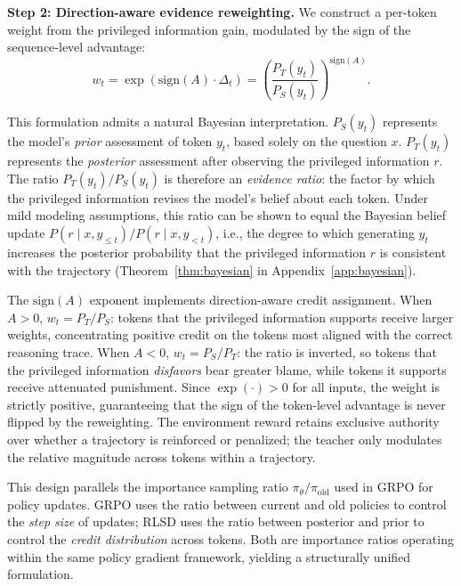 \documentclass[]{jingdong}
\begin{document}
\noindent \textbf{Step 2: Direction-aware evidence reweighting.}
We construct a per-token weight from the privileged information gain, modulated by the sign of the sequence-level advantage:
\begin{equation}
    w_t = \exp\!\left(\mathrm{sign}(A) \cdot \Delta_t\right) = \left(\frac{P_T(y_t)}{P_S(y_t)}\right)^{\mathrm{sign}(A)}.
    \label{eq:weight}
\end{equation}
 
This formulation admits a natural Bayesian interpretation. $P_S(y_t)$ represents the model's \textit{prior} assessment of token $y_t$, based solely on the question $x$. $P_T(y_t)$ represents the \textit{posterior} assessment after observing the privileged information $r$. The ratio $P_T(y_t)/P_S(y_t)$ is therefore an \textit{evidence ratio}: the factor by which the privileged information revises the model's belief about each token. Under mild modeling assumptions, this ratio can be shown to equal the Bayesian belief update $P(r \mid x, y_{\leq t}) / P(r \mid x, y_{<t})$, i.e., the degree to which generating $y_t$ increases the posterior probability that the privileged information $r$ is consistent with the trajectory (Theorem~\ref{thm:bayesian} in Appendix~\ref{app:bayesian}).
 
The $\mathrm{sign}(A)$ exponent implements direction-aware credit assignment. When $A > 0$, $w_t = P_T/P_S$: tokens that the privileged information supports receive larger weights, concentrating positive credit on the tokens most aligned with the correct reasoning trace. When $A < 0$, $w_t = P_S/P_T$: the ratio is inverted, so tokens that the privileged information \textit{disfavors} bear greater blame, while tokens it supports receive attenuated punishment. Since $\exp(\cdot) > 0$ for all inputs, the weight is strictly positive, guaranteeing that the sign of the token-level advantage is never flipped by the reweighting. The environment reward retains exclusive authority over whether a trajectory is reinforced or penalized; the teacher only modulates the relative magnitude across tokens within a trajectory.
 
This design parallels the importance sampling ratio $\pi_\theta / \pi_{\mathrm{old}}$ used in GRPO for policy updates. GRPO uses the ratio between current and old policies to control the \textit{step size} of updates; RLSD uses the ratio between posterior and prior to control the \textit{credit distribution} across tokens. Both are importance ratios operating within the same policy gradient framework, yielding a structurally unified formulation.
\end{document}
